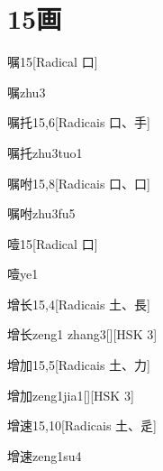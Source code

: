 
\section*{15画}

\begin{entry}{嘱}{15}[Radical ⼝]
  \begin{phonetics}{嘱}{zhu3}
  \end{phonetics}
\end{entry}

\begin{entry}{嘱托}{15,6}[Radicais ⼝、⼿]
  \begin{phonetics}{嘱托}{zhu3tuo1}
  \end{phonetics}
\end{entry}

\begin{entry}{嘱咐}{15,8}[Radicais ⼝、⼝]
  \begin{phonetics}{嘱咐}{zhu3fu5}
  \end{phonetics}
\end{entry}

\begin{entry}{噎}{15}[Radical ⼝]
  \begin{phonetics}{噎}{ye1}
  \end{phonetics}
\end{entry}

\begin{entry}{增长}{15,4}[Radicais ⼟、⾧]
  \begin{phonetics}{增长}{zeng1 zhang3}[][HSK 3]
  \end{phonetics}
\end{entry}

\begin{entry}{增加}{15,5}[Radicais ⼟、⼒]
  \begin{phonetics}{增加}{zeng1jia1}[][HSK 3]
  \end{phonetics}
\end{entry}

\begin{entry}{增速}{15,10}[Radicais ⼟、⾡]
  \begin{phonetics}{增速}{zeng1su4}
  \end{phonetics}
\end{entry}

